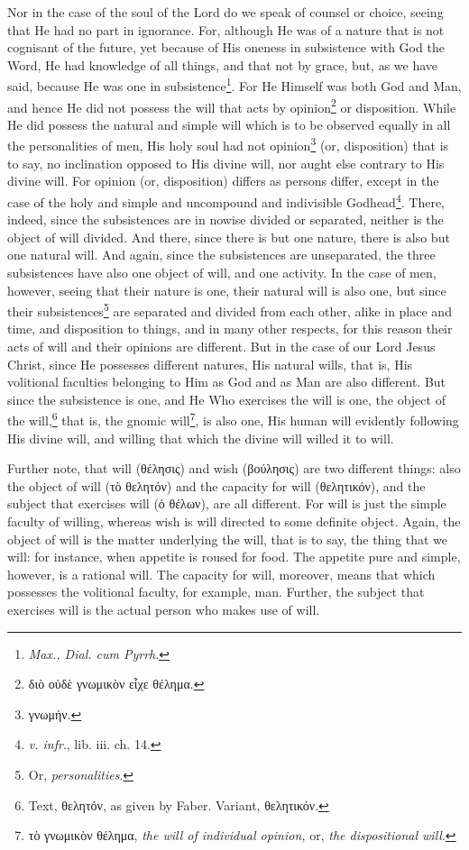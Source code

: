 Nor in the case of the soul of the Lord do we speak of counsel or choice, seeing that He had no part in ignorance. For, although He was of a nature that is not cognisant of the future, yet because of His oneness in subsistence with God the Word, He had knowledge of all things, and that not by grace, but, as we have said, because He was one in subsistence\footnote{\emph{Max., Dial. cum Pyrrh}.}. For He Himself was both God and Man, and hence He did not possess the will that acts by opinion\footnote{\textgreek{διὸ οὐδὲ γνωμικὸν εἶχε θέλημα}.} or disposition. While He did possess the natural and simple will which is to be observed equally in all the personalities of men, His holy soul had not opinion\footnote{\textgreek{γνωμήν}.} (or, disposition) that is to say, no inclination opposed to His divine will, nor aught else contrary to His divine will. For opinion (or, disposition) differs as persons differ, except in the case of the holy and simple and uncompound and indivisible Godhead\footnote{\emph{v. infr}., lib. iii. ch. 14.}. There, indeed, since the subsistences are in nowise divided or separated, neither is the object of will divided. And there, since there is but one nature, there is also but one natural will. And again, since the subsistences are unseparated, the three subsistences have also one object of will, and one activity. In the case of men, however, seeing that their nature is one, their natural will is also one, but since their subsistences\footnote{Or, \emph{personalities}.} are separated and divided from each other, alike in place and time, and disposition to things, and in many other respects, for this reason their acts of will and their opinions are different. But in the case of our Lord Jesus Christ, since He possesses different natures, His natural wills, that is, His volitional faculties belonging to Him as God and as Man are also different. But since the subsistence is one, and He Who exercises the will is one, the object of the will,\footnote{Text, \textgreek{θελητόν}, as given by Faber. Variant, \textgreek{θελητικόν}.} that is, the gnomic will\footnote{\textgreek{τὸ γνωμικὸν θέλημα}, \emph{the will of individual opinion, }or, \emph{the dispositional will}.}, is also one, His human will evidently following His divine will, and willing that which the divine will willed it to will.

Further note, that will (\textgreek{θέλησις}) and wish (\textgreek{βούλησις}) are two different things: also the object of will (\textgreek{τὸ θελητόν}) and the capacity for will (\textgreek{θελητικόν}), and the subject that exercises will (\textgreek{ὁ θέλων}), are all different. For will is just the simple faculty of willing, whereas wish is will directed to some definite object. Again, the object of will is the matter underlying the will, that is to say, the thing that we will: for instance, when appetite is roused for food. The appetite pure and simple, however, is a rational will. The capacity for will, moreover, means that which possesses the volitional faculty, for example, man. Further, the subject that exercises will is the actual person who makes use of will.

